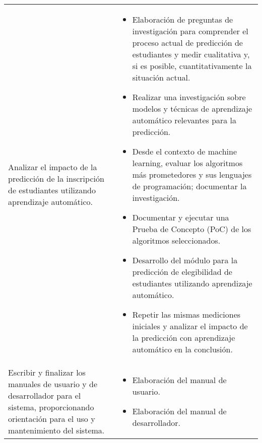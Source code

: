 {\begin{longtable}{>{\raggedright}p{2in}>{\raggedright\arraybackslash}p{4in}}
Analizar el impacto de la predicción de la inscripción de estudiantes utilizando aprendizaje automático. &
\begin{itemize}[nosep,leftmargin=1em,topsep=0pt]
\item Elaboración de preguntas de investigación para comprender el proceso actual de predicción de estudiantes y medir cualitativa y, si es posible, cuantitativamente la situación actual.
\item Realizar una investigación sobre modelos y técnicas de aprendizaje automático relevantes para la predicción.
\item Desde el contexto de machine learning, evaluar los algoritmos más prometedores y sus lenguajes de programación; documentar la investigación.
\item Documentar y ejecutar una Prueba de Concepto (PoC) de los algoritmos seleccionados.
\item Desarrollo del módulo para la predicción de elegibilidad de estudiantes utilizando aprendizaje automático.
\item Repetir las mismas mediciones iniciales y analizar el impacto de la predicción con aprendizaje automático en la conclusión.
\end{itemize} \\

Escribir y finalizar los manuales de usuario y de desarrollador para el sistema, proporcionando orientación para el uso y mantenimiento del sistema. &
\begin{itemize}[nosep,leftmargin=1em,topsep=0pt]
\item Elaboración del manual de usuario.
\item Elaboración del manual de desarrollador.
\end{itemize} \\

\end{longtable}
}
